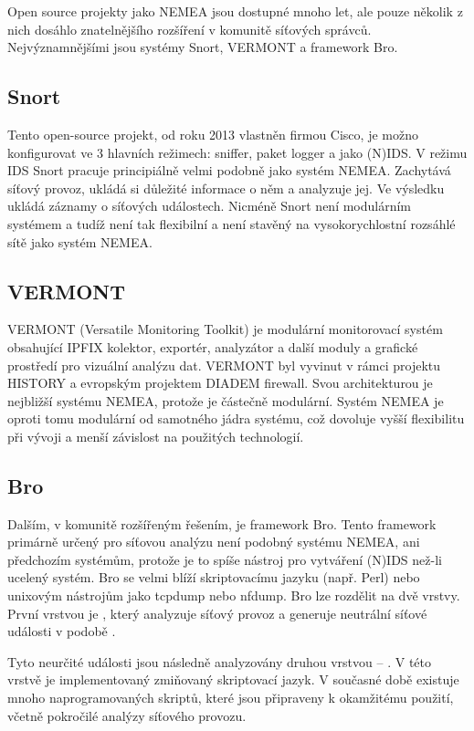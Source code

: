 Open source projekty jako NEMEA jsou dostupné mnoho let, ale pouze několik z nich dosáhlo znatelnějšího rozšíření v komunitě síťových správců. Nejvýznamnějšími jsou systémy Snort\cite{snort}, VERMONT\cite{vermont} a framework Bro\cite{bro}. 

\subsection*{Snort}
Tento open-source projekt, od roku 2013 vlastněn firmou Cisco\cite{snort:cisco}, je možno konfigurovat ve 3 hlavních režimech\cite{snort:modes}: sniffer, paket logger a jako (N)IDS. V režimu IDS Snort pracuje principiálně velmi podobně jako systém NEMEA. Zachytává síťový provoz, ukládá si důležité informace o něm a analyzuje jej. Ve výsledku ukládá záznamy o síťových událostech. Nicméně Snort není modulárním systémem a tudíž není tak flexibilní a není stavěný na vysokorychlostní rozsáhlé sítě jako systém NEMEA.

\subsection*{VERMONT}

VERMONT (Versatile Monitoring Toolkit) je modulární monitorovací systém obsahující IPFIX kolektor, exportér, analyzátor a další moduly a grafické prostředí pro vizuální analýzu dat. VERMONT byl vyvinut v rámci projektu HISTORY\cite{vermont:history} a evropským projektem DIADEM firewall\cite{vermont:diadem}. Svou architekturou je nejbližší systému NEMEA, protože je částečně modulární. Systém NEMEA je oproti tomu modulární od samotného jádra systému, což dovoluje vyšší flexibilitu při vývoji a menší závislost na použitých technologií.

\subsection*{Bro}
Dalším, v komunitě rozšířeným řešením, je framework Bro. Tento framework primárně určený pro síťovou analýzu není podobný systému NEMEA, ani předchozím systémům, protože je to spíše nástroj pro vytváření (N)IDS než-li ucelený systém. Bro se velmi blíží skriptovacímu jazyku (např. Perl) nebo unixovým nástrojům jako tcpdump nebo nfdump. Bro lze rozdělit na dvě vrstvy. První vrstvou je , který analyzuje síťový provoz a generuje neutrální síťové události v podobě . 

Tyto neurčité události jsou následně analyzovány druhou vrstvou -- . V této vrstvě je implementovaný zmiňovaný skriptovací jazyk. V současné době existuje mnoho naprogramovaných skriptů, které jsou připraveny k okamžitému použití, včetně pokročilé analýzy síťového provozu.

